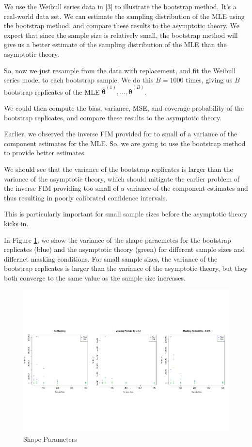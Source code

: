 \documentclass[
]{article}
\begin{document}
We use the Weibull series data in {[}3{]} to illustrate the bootstrap
method. It's a real-world data set. We can estimate the sampling
distribution of the MLE using the bootstrap method, and compare these
results to the asymptotic theory. We expect that since the sample size
is relatively small, the bootstrap method will give us a better estimate
of the sampling distribution of the MLE than the asymptotic theory.

So, now we just resample from the data with replacement, and fit the
Weibull series model to each bootstrap sample. We do this \(B = 1000\)
times, giving us \(B\) bootstrap replicates of the MLE
\(\hat{\boldsymbol{\theta}}^{(1)},\ldots,\hat{\boldsymbol{\theta}}^{(B)}\).

We could then compute the bias, variance, MSE, and coverage probability
of the bootstrap replicates, and compare these results to the asymptotic
theory.

Earlier, we observed the inverse FIM provided for to small of a variance
of the component estimates for the MLE. So, we are going to use the
bootstrap method to provide better estimates.

We should see that the variance of the bootstrap replicates is larger
than the variance of the asymptotic theory, which should mitigate the
earlier problem of the inverse FIM providing too small of a variance of
the component estimates and thus resulting in poorly calibrated
confidence intervals.

This is particularly important for small sample sizes before the
asymptotic theory kicks in.

In Figure \ref{fig:ci-boot-shape}, we show the variance of the shape
paraemetes for the bootstrap replicates (blue) and the asymptotic theory
(green) for different sample sizes and differnet masking conditions. For
small sample sizes, the variance of the bootstrap replicates is larger
than the variance of the asymptotic theory, but they both converge to
the same value as the sample size increases.

\begin{figure}

{\centering \includegraphics[width=1\linewidth]{wei_series_md_files/figure-latex/ci-boot-shape-1} 

}

\caption{Shape Parameters}\label{fig:ci-boot-shape}
\end{figure}
\end{document}
